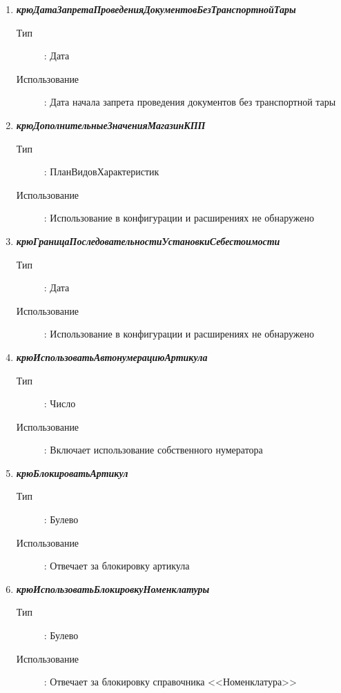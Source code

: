 \begin{enumerate}[label=(\arabic*)]

\vspace{\baselineskip}
\item \textbf{\textit{крюДатаЗапретаПроведенияДокументовБезТранспортнойТары}}
\begin{description}
	\item[Тип] : Дата
	\item[Использование] : Дата начала запрета проведения документов без транспортной тары
\end{description}
\vspace{\baselineskip}
\item \textbf{\textit{крюДополнительныеЗначенияМагазинКПП}}
\begin{description}
	\item[Тип] : ПланВидовХарактеристик
	\item[Использование] : Использование в конфигурации и расширениях не обнаружено
\end{description}
\vspace{\baselineskip}
\item \textbf{\textit{крюГраницаПоследовательностиУстановкиСебестоимости}}
\begin{description}
	\item[Тип] : Дата
	\item[Использование]: Использование в конфигурации и расширениях не обнаружено
\end{description}

\vspace{\baselineskip}
\item \textbf{\textit{крюИспользоватьАвтонумерациюАртикула}}
\begin{description}
	\item[Тип] : Число
	\item[Использование]: Включает использование собственного нумератора
\end{description}

\vspace{\baselineskip}
\item \textbf{\textit{крюБлокироватьАртикул}}
\begin{description}
	\item[Тип] : Булево
	\item[Использование]: Отвечает за блокировку артикула
\end{description}

\vspace{\baselineskip}
\item \textbf{\textit{крюИспользоватьБлокировкуНоменклатуры}}
\begin{description}
	\item[Тип] : Булево
	\item[Использование]: Отвечает за блокировку справочника <<Номенклатура>>
\end{description}


\end{enumerate}
